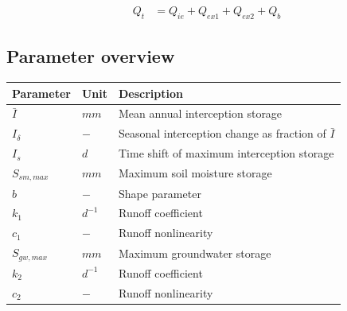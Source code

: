 \begin{align}
	Q_t &= Q_{ie}+Q_{ex1}+Q_{ex2}+Q_b
\end{align}

\newpage
\subsection{Parameter overview}
\begin{table}[htbp]
  \centering
    \begin{tabular}{lll}
    \toprule
    Parameter & Unit  & Description \\
    \midrule
    $\bar{I}$ & $mm$  & Mean annual interception storage \\
    $I_{\delta}$ & $-$   & Seasonal interception change as fraction of $\bar{I}$ \\
    $I_s$ & $d$   & Time shift of maximum interception storage \\
    $S_{sm,max}$ & $mm$  & Maximum soil moisture storage \\
    $b$   & $-$   & Shape parameter \\
    $k_1$ & $d^{-1}$ & Runoff coefficient \\
    $c_1$ & $-$   & Runoff nonlinearity \\
    $S_{gw,max}$ & $mm$  & Maximum groundwater storage \\
    $k_2$ & $d^{-1}$ & Runoff coefficient \\
    $c_2$ & $-$   & Runoff nonlinearity \\
    \bottomrule
    \end{tabular}%
  \label{tab:addlabel}%
\end{table}%
